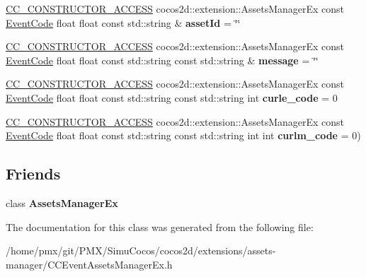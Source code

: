 \begin{DoxyCompactItemize}
\item 
\mbox{\label{classEventAssetsManagerEx_abac5ce307a1b5f72d7939c08dacf065f}} 
\hyperlink{_2cocos2d_2cocos_2base_2ccConfig_8h_a25ef1314f97c35a2ed3d029b0ead6da0}{C\+C\+\_\+\+C\+O\+N\+S\+T\+R\+U\+C\+T\+O\+R\+\_\+\+A\+C\+C\+E\+SS} cocos2d\+::extension\+::\+Assets\+Manager\+Ex const \hyperlink{classEventAssetsManagerEx_ae48992cd906169f84a146e7ae8851cae}{Event\+Code} float float const std\+::string \& {\bfseries asset\+Id} = \char`\"{}\char`\"{}
\item 
\mbox{\label{classEventAssetsManagerEx_a214726a31c1f26041337b3c3b71822ad}} 
\hyperlink{_2cocos2d_2cocos_2base_2ccConfig_8h_a25ef1314f97c35a2ed3d029b0ead6da0}{C\+C\+\_\+\+C\+O\+N\+S\+T\+R\+U\+C\+T\+O\+R\+\_\+\+A\+C\+C\+E\+SS} cocos2d\+::extension\+::\+Assets\+Manager\+Ex const \hyperlink{classEventAssetsManagerEx_ae48992cd906169f84a146e7ae8851cae}{Event\+Code} float float const std\+::string const std\+::string \& {\bfseries message} = \char`\"{}\char`\"{}
\item 
\mbox{\label{classEventAssetsManagerEx_a8ebd24fae196a72ea64acf535d7c16c5}} 
\hyperlink{_2cocos2d_2cocos_2base_2ccConfig_8h_a25ef1314f97c35a2ed3d029b0ead6da0}{C\+C\+\_\+\+C\+O\+N\+S\+T\+R\+U\+C\+T\+O\+R\+\_\+\+A\+C\+C\+E\+SS} cocos2d\+::extension\+::\+Assets\+Manager\+Ex const \hyperlink{classEventAssetsManagerEx_ae48992cd906169f84a146e7ae8851cae}{Event\+Code} float float const std\+::string const std\+::string int {\bfseries curle\+\_\+code} = 0
\item 
\mbox{\label{classEventAssetsManagerEx_a9bfbe2cd044f8db3bb6f5c339871de83}} 
\hyperlink{_2cocos2d_2cocos_2base_2ccConfig_8h_a25ef1314f97c35a2ed3d029b0ead6da0}{C\+C\+\_\+\+C\+O\+N\+S\+T\+R\+U\+C\+T\+O\+R\+\_\+\+A\+C\+C\+E\+SS} cocos2d\+::extension\+::\+Assets\+Manager\+Ex const \hyperlink{classEventAssetsManagerEx_ae48992cd906169f84a146e7ae8851cae}{Event\+Code} float float const std\+::string const std\+::string int int {\bfseries curlm\+\_\+code} = 0)
\end{DoxyCompactItemize}
\subsection*{Friends}
\begin{DoxyCompactItemize}
\item 
\mbox{\label{classEventAssetsManagerEx_ab7c03d53ce1728b650be327ea3cd0506}} 
class {\bfseries Assets\+Manager\+Ex}
\end{DoxyCompactItemize}


The documentation for this class was generated from the following file\+:\begin{DoxyCompactItemize}
\item 
/home/pmx/git/\+P\+M\+X/\+Simu\+Cocos/cocos2d/extensions/assets-\/manager/C\+C\+Event\+Assets\+Manager\+Ex.\+h\end{DoxyCompactItemize}
